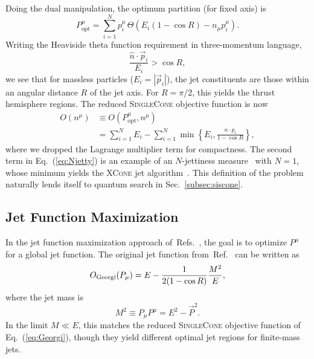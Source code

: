 \documentclass[aps,prd,twocolumn,superscriptaddress,preprintnumbers,nofootinbib,longbibliography,floatfix]{revtex4-1}
\DeclareRobustCommand{\Sec}[1]{Sec.~\ref{#1}}
\DeclareRobustCommand{\Eq}[1]{Eq.~(\ref{#1})}
\DeclareRobustCommand{\Ref}[1]{Ref.~\cite{#1}}
\DeclareRobustCommand{\Refs}[1]{Refs.~\cite{#1}}
\newcommand{\opt}{\text{opt}}
\begin{document}
Doing the dual manipulation, the optimum partition (for fixed axis) is
%
\begin{equation}
P_{\opt}^\mu = \sum_{i = 1}^N p^\mu_i \, \Theta(E_i (1 - \cos R) - n_\mu p^\mu_i).
\end{equation}
%
Writing the Heaviside theta function requirement in three-momentum language,
%
\begin{equation}
\label{eq:conical}
\frac{\hat{n} \cdot \vec{p}_i}{E_i} > \cos R,
\end{equation}
%
we see that for massless particles ($E_i = |\vec{p}_i|$), the jet constituents are those within an angular distance $R$ of the jet axis.
%
For $R = \pi/2$, this yields the thrust hemisphere regions.
%
The reduced \textsc{SingleCone} objective function is now
%
\begin{align}
O(n^\mu) &\equiv O(P^{\mu}_{\opt}, n^{\mu})  \nonumber\\
&= \sum_{i = 1}^N E_i - \sum_{i = 1}^N \min \left\{E_i, \frac{n\cdot p_i}{1 - \cos R}\right\}, 
\label{eq:Njetty}
\end{align}
%
where we dropped the Lagrange multiplier term for compactness.
%
The second term in \Eq{eq:Njetty} is an example of an $N$-jettiness measure~\cite{Stewart:2010tn,Thaler:2010tr,Thaler:2011gf} with $N = 1$, whose minimum yields the \textsc{XCone} jet algorithm~\cite{Stewart:2015waa,Thaler:2015xaa}.
%
This definition of the problem naturally lends itself to quantum search in \Sec{subsec:siscone}.



\subsection{Jet Function Maximization}
\label{subsec:georgi}


In the jet function maximization approach of~\Refs{Georgi:2014zwa, Ge:2014ova, Bai:2014qca}, the goal is to optimize $P^{\mu}$ for a global jet function.
%
The original jet function from~\Ref{Georgi:2014zwa} can be written as
%
\begin{equation}
\label{eq:origGeorgi}
O_{\rm Georgi}(P_\mu)=E-\frac{1}{2 (1 - \cos R)}\frac{M^2}{E},
\end{equation}
%
where the jet mass is
%
\begin{equation}
M^2 \equiv P_\mu P^\mu = E^2 - \vec{P}^2.
\end{equation}
%
In the limit $M \ll E$, this matches the reduced \textsc{SingleCone} objective function of \Eq{eq:Georgi}, though they yield different optimal jet regions for finite-mass jets.
\end{document}
